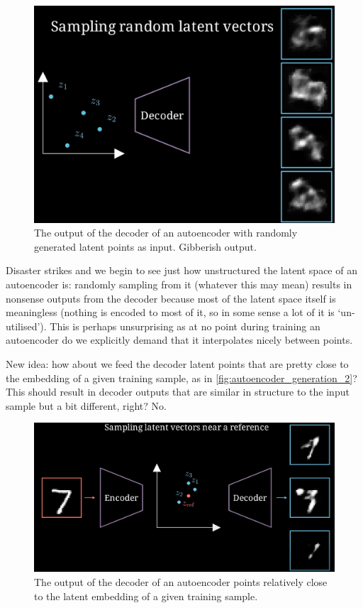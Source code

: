 \documentclass[11pt]{article}
\begin{document}
\begin{figure}[t]
    \centering
    \includegraphics[width=0.60\columnwidth]{./figures/generative_models/AE_gen_1.png}
    \caption{The output of the decoder of an autoencoder with randomly generated latent points as input. Gibberish output. }
    \label{fig:autoencoder_generation_1}
\end{figure}

Disaster strikes and we begin to see just how unstructured the latent space of an autoencoder is: randomly sampling from it (whatever this may mean) results in nonsense outputs from the decoder because most of the latent space itself is meaningless (nothing is encoded to most of it, so in some sense a lot of it is `un-utilised'). This is perhaps unsurprising as at no point during training an autoencoder do we explicitly demand that it interpolates nicely between points.

New idea: how about we feed the decoder latent points that are pretty close to the embedding of a given training sample, as in \autoref{fig:autoencoder_generation_2}? This should result in decoder outputs that are similar in structure to the input sample but a bit different, right? No.

\begin{figure}[t]
    \centering
    \includegraphics[width=0.75\columnwidth]{./figures/generative_models/AE_gen_2.png}
    \caption{The output of the decoder of an autoencoder points relatively close to the latent embedding of a given training sample. }
    \label{fig:autoencoder_generation_2}
\end{figure}
\end{document}
